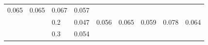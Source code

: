\documentclass[12pt,oneside,a4paper]{reedthesis}
\begin{document}
\begin{longtable}[]{@{}lllllllll@{}}
\begin{minipage}[t]{0.08\columnwidth}
0.065\strut
\end{minipage} & \begin{minipage}[t]{0.08\columnwidth}\raggedright
0.065\strut
\end{minipage} & \begin{minipage}[t]{0.08\columnwidth}\raggedright
0.067\strut
\end{minipage} & \begin{minipage}[t]{0.08\columnwidth}\raggedright
0.057\strut
\end{minipage}\tabularnewline
\begin{minipage}[t]{0.12\columnwidth}\raggedright
\strut
\end{minipage} & \begin{minipage}[t]{0.09\columnwidth}\raggedright
\strut
\end{minipage} & \begin{minipage}[t]{0.06\columnwidth}\raggedright
0.2\strut
\end{minipage} & \begin{minipage}[t]{0.08\columnwidth}\raggedright
0.047\strut
\end{minipage} & \begin{minipage}[t]{0.08\columnwidth}\raggedright
0.056\strut
\end{minipage} & \begin{minipage}[t]{0.08\columnwidth}\raggedright
0.065\strut
\end{minipage} & \begin{minipage}[t]{0.08\columnwidth}\raggedright
0.059\strut
\end{minipage} & \begin{minipage}[t]{0.08\columnwidth}\raggedright
0.078\strut
\end{minipage} & \begin{minipage}[t]{0.08\columnwidth}\raggedright
0.064\strut
\end{minipage}\tabularnewline
\begin{minipage}[t]{0.12\columnwidth}\raggedright
\strut
\end{minipage} & \begin{minipage}[t]{0.09\columnwidth}\raggedright
\strut
\end{minipage} & \begin{minipage}[t]{0.06\columnwidth}\raggedright
0.3\strut
\end{minipage} & \begin{minipage}[t]{0.08\columnwidth}\raggedright
0.054\strut
\end{minipage} & \begin{minipage}[t]{0.08\columnwidth}\raggedright

\end{minipage}
\end{longtable}
\end{document}
